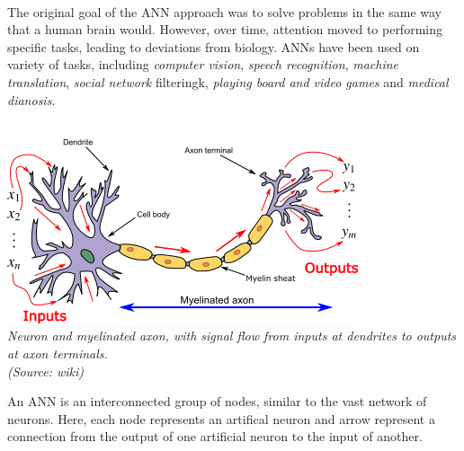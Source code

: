 \\
The original goal of the ANN approach was to solve problems in the same way that a human brain would. However, over time, attention moved to performing specific tasks, leading to deviations from biology. ANNs have been used on variety of tasks, including \textit{computer vision}, \textit{speech recognition}, \textit{machine translation}, \textit{social network} filteringk, \textit{playing board and video games} and \textit{medical dianosis}.\\
\\
\begin{center}
\includegraphics[scale=1]{Neuron3}\\
\textit{Neuron and myelinated axon, with signal flow from inputs at dendrites to outputs at axon terminals.}\\
\textit{(Source: wiki)}
\end{center}
An ANN is an interconnected group of nodes, similar to the vast network of neurons. Here, each node represents an artifical neuron and arrow represent a connection from the output of one artificial neuron to the input of another.\\
